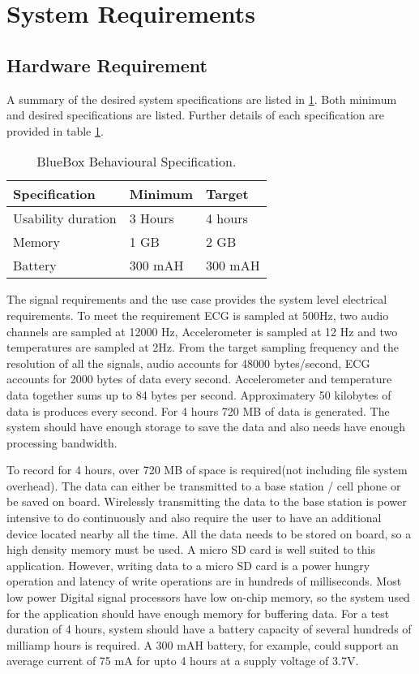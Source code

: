 \section{System Requirements}\label{system requirements}
\subsection{Hardware Requirement}

A summary of the desired system specifications are listed in \ref{table:Behavioural_specs}. Both minimum and desired specifications are listed. Further details of each specification are provided in table \ref{table:Behavioural_specs}.
\begin{table}[h]
	\centering
	\begin{tabular}{|l|l|l|}
		\hline
		Specification & Minimum & Target \\
		\hline
		Usability duration & 3 Hours & 4 hours \\
		Memory & 1 GB & 2 GB \\
		Battery & 300 mAH & 300 mAH \\
		\hline
	\end{tabular}
	\caption{BlueBox Behavioural Specification.}
	\label{table:Behavioural_specs}
\end{table}

The signal requirements and the use case provides the system level electrical requirements. To meet the requirement ECG is sampled at 500Hz, two audio channels are sampled at 12000 Hz, Accelerometer is sampled at 12 Hz and two temperatures are sampled at 2Hz. From the target sampling frequency and the resolution of all the signals, audio accounts for 48000 bytes/second, ECG accounts for 2000 bytes of data every second. Accelerometer and temperature data together sums up to 84 bytes per second. Approximatery 50 kilobytes of data is produces every second. For 4 hours 720 MB of data is generated. The system should have enough storage to save the data and also needs have enough processing bandwidth. 

 To record for 4 hours, over 720 MB of space is required(not including file system overhead). The data can either be transmitted to a base station / cell phone or be saved on board. Wirelessly transmitting the data to the base station is power intensive to do continuously and also require the user to have an additional device located nearby all the time. All the data needs to be stored on board, so a high density memory must be used. A micro SD card is well suited to this application. However, writing data to a micro SD card is a power hungry operation and latency of write operations are in hundreds of milliseconds. Most low power Digital signal processors have low on-chip memory, so the system used for the application should have enough memory for buffering data. For a test duration of 4 hours, system should have a battery capacity of several hundreds of milliamp hours is required. A 300 mAH battery, for example, could support an average current of 75 mA for upto 4 hours at a supply voltage of 3.7V. 

